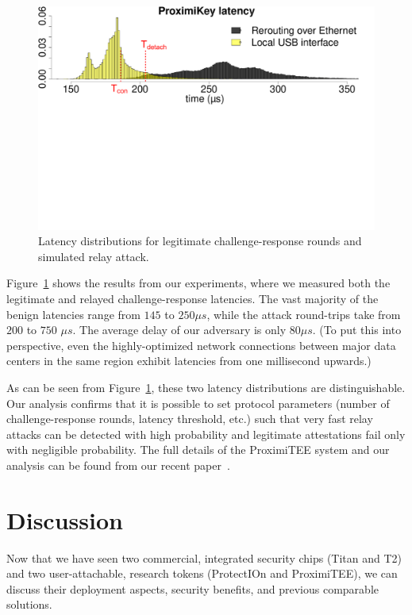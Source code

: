 \documentclass[letterpaper,twocolumn,10pt]{article}
\newcommand{\protection}{\textsf{ProtectIOn}\xspace}
\newcommand{\proximitee}{\textsf{ProximiTEE}\xspace}
\begin{document}
\begin{figure}[t]
  \centering
    \includegraphics[trim={0 13.4cm 0 0},
    clip,width=\linewidth]{Kostiainen-Fig3.pdf} 
    \caption{Latency distributions for legitimate challenge-response rounds and simulated relay attack.}
    \label{graph:histogram}
\end{figure}

Figure~\ref{graph:histogram} shows the results from our experiments, where we measured both the legitimate and relayed challenge-response latencies. The vast majority of the benign latencies range from $145$ to $250 \mu s$, while the attack round-trips take from $200$ to $750$ $\mu s$. The average delay of our adversary is only $80 \mu s$. (To put this into perspective, even the highly-optimized network connections between major data centers in the same region exhibit latencies from one millisecond upwards.) 

As can be seen from Figure~\ref{graph:histogram}, these two latency distributions are distinguishable. Our analysis confirms that it is possible to set protocol parameters (number of challenge-response rounds, latency threshold, etc.) such that very fast relay attacks can be detected with high probability and legitimate attestations fail only with negligible probability. The full details of the \proximitee system and our analysis can be found from our recent paper~\cite{proximitee}.


\section*{Discussion}

Now that we have seen two commercial, integrated security chips (Titan and T2) and two user-attachable, research tokens (\protection and \proximitee), we can discuss their deployment aspects, security benefits, and previous comparable solutions. 
\end{document}
